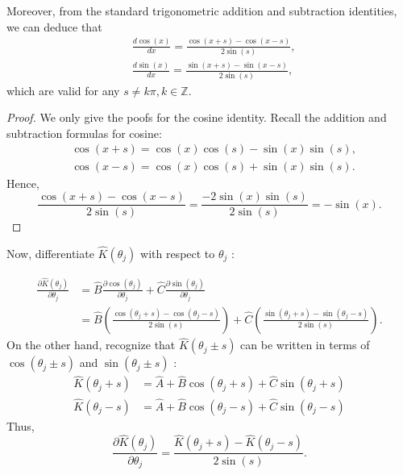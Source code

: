 Moreover, from the standard trigonometric addition and subtraction identities, we can deduce that
\begin{equation}
\begin{aligned}
& \frac{d \cos (x)}{d x}=\frac{\cos (x+s)-\cos (x-s)}{2 \sin (s)}, \\
& \frac{d \sin (x)}{d x}=\frac{\sin (x+s)-\sin (x-s)}{2 \sin (s)},
\end{aligned}
\end{equation}
which are valid for any $s \neq k \pi, k \in \mathbb{Z}$.

\begin{proof}
    We only give the poofs for the cosine identity. Recall the addition and subtraction formulas for cosine:
\begin{equation}
\begin{aligned}
& \cos (x+s)=\cos (x) \cos (s)-\sin (x) \sin (s), \\
& \cos (x-s)=\cos (x) \cos (s)+\sin (x) \sin (s).
\end{aligned}
\end{equation}
Hence,
\begin{equation}
    \frac{\cos (x+s)-\cos (x-s)}{2 \sin (s)}=\frac{-2 \sin (x) \sin (s)}{2 \sin (s)}=-\sin (x).
\end{equation}
\end{proof}

Now, differentiate $\hat{K}\left(\theta_j\right)$ with respect to $\theta_j$ :

\begin{align}
\frac{\partial \hat{K}\left(\theta_j\right)}{\partial \theta_j}
&=\hat{B}\frac{\partial \cos \left(\theta_j\right)}{\partial \theta_j} +\hat{C}\frac{\partial \sin \left(\theta_j\right)}{\partial \theta_j} \\
&=\hat{B}\left(\frac{\cos \left(\theta_j+s\right)-\cos \left(\theta_j-s\right)}{2 \sin (s)}\right)+\hat{C}\left(\frac{\sin \left(\theta_j+s\right)-\sin \left(\theta_j-s\right)}{2 \sin (s)}\right).
\end{align}
On the other hand, recognize that $\hat{K}\left(\theta_j \pm s\right)$ can be written in terms of $\cos \left(\theta_j \pm s\right)$ and $\sin \left(\theta_j \pm s\right)$ :
\begin{equation}
\begin{aligned}
\hat{K}\left(\theta_j+s\right) & =\hat{A}+\hat{B} \cos \left(\theta_j+s\right)+\hat{C} \sin \left(\theta_j+s\right) \\
\hat{K}\left(\theta_j-s\right) & =\hat{A}+\hat{B} \cos \left(\theta_j-s\right)+\hat{C} \sin \left(\theta_j-s\right)
\end{aligned}
\end{equation}
Thus,
\begin{equation}
    \frac{\partial \hat{K}\left(\theta_j\right)}{\partial \theta_j}=\frac{\hat{K}\left(\theta_j+s\right)-\hat{K}\left(\theta_j-s\right)}{2 \sin (s)}.
\end{equation}

